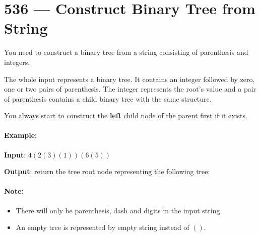 \section{536 --- Construct Binary Tree from String}
You need to construct a binary tree from a string consisting of parenthesis and integers.

The whole input represents a binary tree. It contains an integer followed by zero, one or two pairs of parenthesis. The integer represents the root's value and a pair of parenthesis contains a child binary tree with the same structure.

You always start to construct the \textbf{left} child node of the parent first if it exists.

\paragraph{Example:}

\begin{flushleft}
\textbf{Input}: $4(2(3)(1))(6(5))$

\textbf{Output}: return the tree root node representing the following tree:

\begin{figure}[H]
\end{figure}



\end{flushleft}

\paragraph{Note:}

\begin{itemize}
\item  There will only be parenthesis, dash and digits in the input string.
\item An empty tree is represented by empty string instead of $()$.
\end{itemize}

